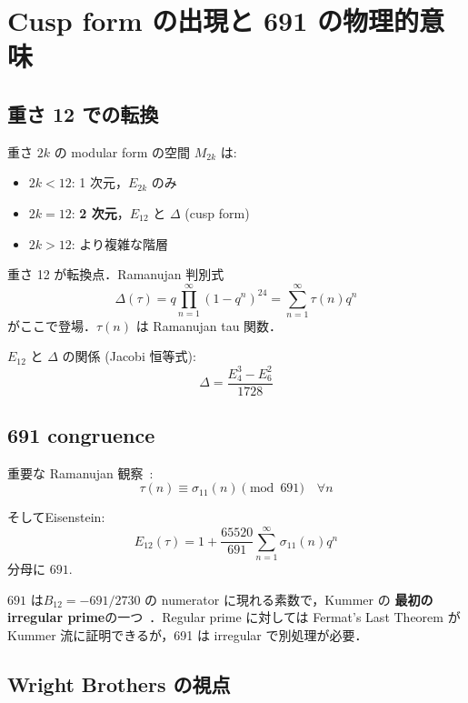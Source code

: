 \documentclass[11pt,a4paper]{article}
\begin{document}
\section{Cusp form の出現と 691 の物理的意味}

\subsection{重さ 12 での転換}

重さ $2k$ の modular form の空間 $M_{2k}$ は:
\begin{itemize}
\item $2k < 12$: 1 次元，$E_{2k}$ のみ
\item $2k = 12$: \textbf{2 次元}，$E_{12}$ と $\Delta$ (cusp form)
\item $2k > 12$: より複雑な階層
\end{itemize}

重さ 12 が転換点．Ramanujan 判別式
\begin{equation}
\Delta(\tau) = q\prod_{n=1}^\infty (1 - q^n)^{24} = \sum_{n=1}^\infty \tau(n) q^n
\end{equation}
がここで登場．$\tau(n)$ は Ramanujan tau 関数．

$E_{12}$ と $\Delta$ の関係 (Jacobi 恒等式):
\begin{equation}
\Delta = \frac{E_4^3 - E_6^2}{1728}
\end{equation}

\subsection{691 congruence}

重要な Ramanujan 観察~\cite{Ramanujan1916}:
\begin{equation}
\tau(n) \equiv \sigma_{11}(n) \pmod{691}\quad \forall n
\end{equation}

そしてEisenstein:
\begin{equation}
E_{12}(\tau) = 1 + \frac{65520}{691}\sum_{n=1}^\infty \sigma_{11}(n) q^n
\end{equation}
分母に $691$.

$691$ は$B_{12} = -691/2730$ の numerator に現れる素数で，Kummer の
\textbf{最初の irregular prime}の一つ~\cite{Kummer1850}．Regular prime
に対しては Fermat's Last Theorem が Kummer 流に証明できるが，691 は
irregular で別処理が必要．

\subsection{Wright Brothers の視点}
\end{document}
